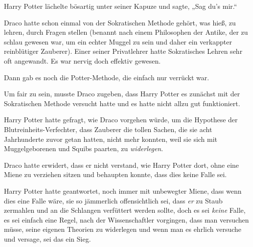 Harry Potter lächelte bösartig unter seiner Kapuze und sagte,
„Sag du’s mir.“

\later

Draco hatte schon einmal von der Sokratischen Methode gehört, was hieß, zu lehren, durch Fragen stellen (benannt nach einem Philosophen der Antike, der zu schlau gewesen war, um ein echter Muggel zu sein und daher ein verkappter reinblütiger Zauberer). Einer seiner Privatlehrer hatte Sokratisches Lehren sehr oft angewandt. Es war nervig doch effektiv gewesen.

Dann gab es noch die Potter-Methode, die einfach nur verrückt war.

Um fair zu sein, musste Draco zugeben, dass Harry Potter es zunächst mit der Sokratischen Methode versucht hatte und es hatte nicht allzu gut funktioniert.

Harry Potter hatte gefragt, wie Draco vorgehen würde, um die Hypothese der Blutreinheits-Verfechter, dass Zauberer die tollen Sachen, die sie acht Jahrhunderte zuvor getan hatten, nicht mehr konnten, weil sie sich mit Muggelgeborenen und Squibs paarten, zu \emph{widerlegen}.

Draco hatte erwidert, dass er nicht verstand, wie Harry Potter dort, ohne eine Miene zu verziehen sitzen und behaupten konnte, dass dies keine Falle sei.

Harry Potter hatte geantwortet, noch immer mit unbewegter Miene, dass wenn dies eine Falle wäre, sie so jämmerlich offensichtlich sei, dass \emph{er} zu Staub zermahlen und an die Schlangen verfüttert werden sollte, doch es sei \emph{keine} Falle, es sei einfach eine Regel, nach der Wissenschaftler vorgingen, dass man versuchen müsse, seine eigenen Theorien zu widerlegen und wenn man es ehrlich versuche und versage, sei das ein Sieg.

